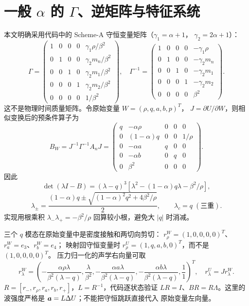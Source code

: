 \documentclass[UTF8,11pt,a4paper]{ctexart}
\begin{document}
\section{一般 $\alpha$ 的 $\Gamma$、逆矩阵与特征系统}
本文明确采用代码中的 Scheme-A 守恒变量矩阵（$\gamma_1=\alpha+1$，
$\gamma_2=2\alpha+1$）：
\begin{equation}
\Gamma=\begin{pmatrix}
1&0&0&0&\gamma_1\rho/\beta^2\\
0&1&0&0&\gamma_2m_n/\beta^2\\
0&0&1&0&\gamma_2m_1/\beta^2\\
0&0&0&1&\gamma_2m_2/\beta^2\\
0&0&0&0&1/\beta^2
\end{pmatrix},\quad
\Gamma^{-1}=\begin{pmatrix}
1&0&0&0&-\gamma_1\rho\\
0&1&0&0&-\gamma_2m_n\\
0&0&1&0&-\gamma_2m_1\\
0&0&0&1&-\gamma_2m_2\\
0&0&0&0&\beta^2
\end{pmatrix}.\label{eq:G}
\end{equation}
这不是物理时间质量矩阵。令原始变量 $W=(\rho,q,a,b,p)^T$，
$J=\partial U/\partial W$，则相似变换后的预条件算子为
\begin{equation}
B_W=J^{-1}\Gamma^{-1}A_nJ=
\begin{pmatrix}
q&-\alpha\rho&0&0&0\\
0&(1-\alpha)q&0&0&1/\rho\\
0&-\alpha a&q&0&0\\
0&-\alpha b&0&q&0\\
0&\beta^2&0&0&0
\end{pmatrix}.\label{eq:Bp}
\end{equation}
因此
\begin{equation}
\det(\lambda I-B)=(\lambda-q)^3
[\lambda^2-(1-\alpha)q\lambda-\beta^2/\rho],
\end{equation}
\begin{equation}
\lambda_{\pm}=\frac{(1-\alpha)q\pm
\sqrt{(1-\alpha)^2q^2+4\beta^2/\rho}}{2},\qquad\lambda_c=q\;(\text{三重}).\label{eq:eigs}
\end{equation}
实现用根乘积 $\lambda_-\lambda_+=-\beta^2/\rho$ 回算较小根，避免大 $|q|$ 时消减。

三个 $q$ 模态在原始变量中是密度接触和两切向剪切：
$r_\rho^W=(1,0,0,0,0)^T$、$r_a^W=e_3$、$r_b^W=e_4$；
映射回守恒变量时
$r_\rho^U=(1,q,a,b,0)^T$，而不是 $(1,0,0,0,0)^T$。
压力归一化的声学右向量可取
\begin{equation}
r_\lambda^W=\left(-\frac{\alpha\rho\lambda}{\beta^2(\lambda-q)},
\frac{\lambda}{\beta^2},-
\frac{\alpha a\lambda}{\beta^2(\lambda-q)},-
\frac{\alpha b\lambda}{\beta^2(\lambda-q)},\frac1{1}\right)^T,
\quad r_\lambda^U=Jr_\lambda^W.\label{eq:R}
\end{equation}
$R=[r_-,r_\rho,r_a,r_b,r_+]$，$L=R^{-1}$，代码逐状态验证
$LR=I$、$BR=R\Lambda$。这里的波强度严格是 $\bm{a}=L\Delta U$；不能把守恒跳跃直接代入
原始变量左向量。
\end{document}
